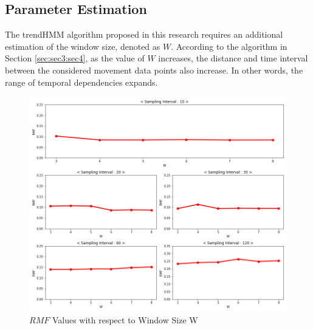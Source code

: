 \documentclass[preprint,12pt]{elsarticle}
\begin{document}
\subsection{Parameter Estimation}
\label{sec:sec4:sec2}
The trendHMM algorithm proposed in this research requires an additional estimation of the window size, denoted as $W$. According to the algorithm in Section \ref{sec:sec3:sec4}, as the value of $W$ increases, the distance and time interval between the considered movement data points also increase. In other words, the range of temporal dependencies expands.
\begin{figure}
	\centering
	\includegraphics[height=0.99\textwidth]{images/fig5white_0}
	\caption{$RMF$ Values with respect to Window Size W}
	\label{fig:fig5}
\end{figure}
\end{document}
